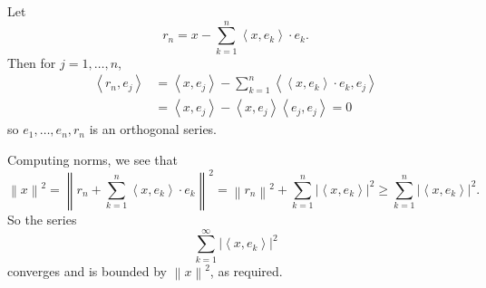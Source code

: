 \documentclass[12pt]{article}
\newcommand{\norm}[1]{\left\|#1\right\|}
\begin{document}
\newcommand{\Hilb}{\mathcal{H}}
\newcommand{\size}[1]{\left|#1\right|}
\newcommand{\scalar}[2]{\left\langle#1,#2\right\rangle}
Let
$$
r_n = x - \sum_{k=1}^{n} \scalar{x}{e_k}\cdot e_k.
$$
Then for $j=1,\ldots,n$,
\begin{eqnarray}
\scalar{r_n}{e_j} &=
\scalar{x}{e_j} -
\sum_{k=1}^{n} \scalar{\scalar{x}{e_k}\cdot e_k}{e_j} \\
&= \scalar{x}{e_j} -
\scalar{x}{e_j}\scalar{e_j}{e_j} = 0
\end{eqnarray}
so $e_1,\ldots,e_n,r_n$ is an orthogonal series.

Computing norms, we see that
$$
\norm{x}^2 = \norm{r_n + \sum_{k=1}^{n} \scalar{x}{e_k}\cdot e_k}^2 =
\norm{r_n}^2 + \sum_{k=1}^{n} \size{\scalar{x}{e_k}}^2 \ge
\sum_{k=1}^{n} \size{\scalar{x}{e_k}}^2.
$$
So the series
$$
\sum_{k=1}^{\infty} \size{\scalar{x}{e_k}}^2
$$
converges and is bounded by $\norm{x}^2$, as required.
\end{document}
